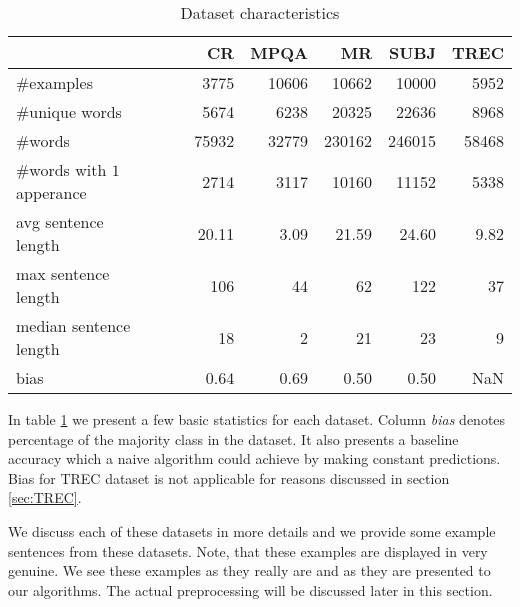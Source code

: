 \begin{table}[h]
\begin{center}

\begin{tabular}{l|rrrrr}
\toprule
{} &        CR &      MPQA &         MR &      SUBJ &      TREC \\\hline
\midrule
\#examples                                &   3775 &  10606 &   10662 &   10000 &   5952 \\\hline
\#unique words                            &   5674 &   6238 &   20325 &   22636 &   8968 \\\hline
\#words                                   &  75932 &  32779 &  230162 &  246015 &  58468 \\\hline
\specialcell{\#words with\\$1$ apperance} &   2714 &   3117 &   10160 &   11152 &   5338 \\\hline
\specialcell{avg sentence\\length}       &     20.11 &      3.09 &      21.59 &      24.60 &      9.82 \\\hline
\specialcell{max sentence\\length}       &    106 &     44 &      62 &     122 &     37 \\\hline
\specialcell{median sentence\\length}    &     18 &      2 &      21 &      23 &      9 \\\hline
bias                                     &      0.64 &      0.69 &       0.50 &       0.50 &       NaN \\
\bottomrule
\end{tabular}

\caption[Dataset characteristics]{Dataset characteristics}
\label{tab:datasets:stats}
\end{center}
\end{table}


    In table \ref{tab:datasets:stats} we present a few basic statistics for each dataset.
    Column \emph{bias} denotes percentage of the majority class in the dataset.
    It also presents a baseline accuracy which a naive algorithm could achieve by making constant predictions. 
    Bias for TREC dataset is not applicable for reasons discussed in section \ref{sec:TREC}.
    
    We discuss each of these datasets in more details and we provide some example sentences from these datasets.
    Note, that these examples  are displayed in very genuine. We see these examples as they really are and as they are presented to our algorithms.
    The actual preprocessing will be discussed later in this section.
    

